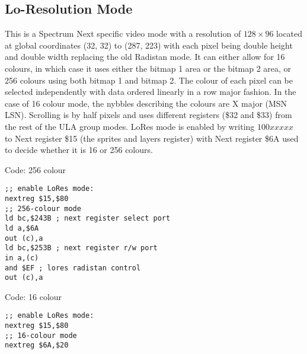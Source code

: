 \subsection{Lo-Resolution Mode}
This is a Spectrum Next specific video mode with a resolution of
$128\times96$ located at global coordinates (32, 32) to (287, 223)
with each pixel being double height and double width replacing the old
Radistan mode.  It can either allow for 16 colours, in which case it
uses either the bitmap 1 area or the bitmap 2 area, or 256 colours
using both bitmap 1 and bitmap 2. The colour of each pixel can be
selected independently with data ordered linearly in a row major
fashion. In the case of 16 colour mode, the nybbles describing the
colours are X major (MSN LSN). Scrolling is by half pixels and uses
different registers (\$32 and \$33) from the rest of the ULA group
modes. LoRes mode is enabled by writing $100xxxxx$ to Next register
\$15 (the sprites and layers register) with Next register \$6A used to
decide whether it is 16 or 256 colours.






Code: 256 colour
\begin{verbatim}
;; enable LoRes mode:
nextreg $15,$80
;; 256-colour mode
ld bc,$243B ; next register select port
ld a,$6A
out (c),a
ld bc,$253B ; next register r/w port
in a,(c)
and $EF ; lores radistan control
out (c),a
\end{verbatim}

Code: 16 colour
\begin{verbatim}
;; enable LoRes mode:
nextreg $15,$80
;; 16-colour mode
nextreg $6A,$20
\end{verbatim}
